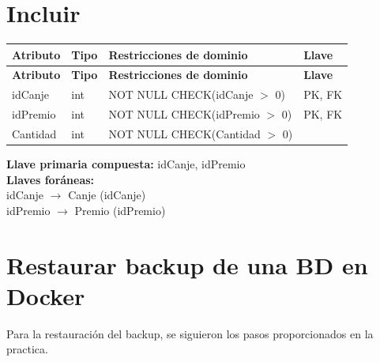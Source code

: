 \documentclass[12pt]{article}
\begin{document}
\section*{Incluir}

\begin{longtable}{p{3.5cm} p{2.5cm} p{7.5cm} p{1.5cm}}
\label{tab:incluir}\\
\toprule
\textbf{Atributo} & \textbf{Tipo} & \textbf{Restricciones de dominio} & \textbf{Llave} \\
\midrule
\endfirsthead

\toprule
\textbf{Atributo} & \textbf{Tipo} & \textbf{Restricciones de dominio} & \textbf{Llave} \\
\midrule
\endhead
\bottomrule
\endfoot

idCanje 
& int 
& NOT NULL \newline CHECK(idCanje $>$ 0)
& PK, FK \\

idPremio 
& int 
& NOT NULL \newline CHECK(idPremio $>$ 0)
& PK, FK \\

Cantidad 
& int 
& NOT NULL \newline CHECK(Cantidad $>$ 0)
&  \\

\end{longtable}

\vspace{2pt}
\textbf{Llave primaria compuesta:} idCanje, idPremio\\
\textbf{Llaves foráneas:}\\
idCanje $\rightarrow$ Canje (idCanje)\\
idPremio $\rightarrow$ Premio (idPremio)\\


\section{Restaurar backup de una BD en Docker}
Para la restauración del backup, se siguieron los pasos proporcionados en la practica.
\end{document}
